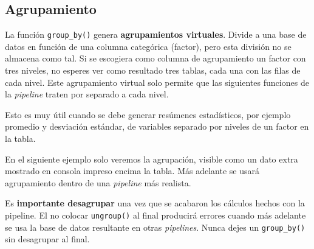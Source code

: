 \documentclass[
]{article}
\theoremstyle{definition}
\theoremstyle{definition}
\theoremstyle{definition}
\theoremstyle{definition}
\theoremstyle{remark}
\begin{document}
\hypertarget{agrupamiento}{%
\subsection{Agrupamiento}\label{agrupamiento}}

La función \texttt{group\_by()} genera \textbf{agrupamientos virtuales}. Divide a una base de datos en función de una columna categórica (factor), pero esta división no se almacena como tal. Si se escogiera como columna de agrupamiento un factor con tres niveles, no esperes ver como resultado tres tablas, cada una con las filas de cada nivel. Este agrupamiento virtual solo permite que las siguientes funciones de la \emph{pipeline} traten por separado a cada nivel.

Esto es muy útil cuando se debe generar resúmenes estadísticos, por ejemplo promedio y desviación estándar, de variables separado por niveles de un factor en la tabla.

En el siguiente ejemplo solo veremos la agrupación, visible como un dato extra mostrado en consola impreso encima la tabla. Más adelante se usará agrupamiento dentro de una \emph{pipeline} más realista.

\begin{rmdwarning}
Es \textbf{importante desagrupar} una vez que se acabaron los cálculos hechos con la pipeline. El no colocar \texttt{ungroup()} al final producirá errores cuando más adelante se usa la base de datos resultante en otras \emph{pipelines}. Nunca dejes un \texttt{group\_by()} sin desagrupar al final.
\end{rmdwarning}
\end{document}
